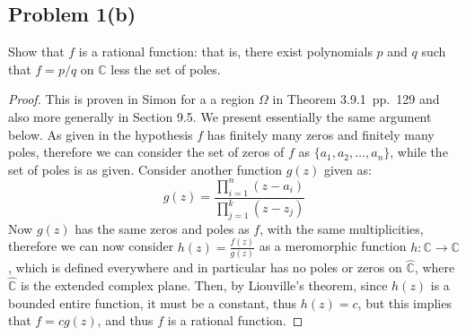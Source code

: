 \documentclass{article}[12pt]
\def\CC{{\mathbb C}}
\begin{document}
\subsection*{Problem 1(b)}Show that $f$ is a rational function: that is,
there exist polynomials $p$ and $q$ such that $f=p/q$ on $\CC$ less
the set of poles.
\begin{proof}
This is proven in Simon for a a region $\Omega$ in Theorem 3.9.1~pp.~129
and also more generally in Section 9.5. We present essentially the
same argument below.
As given in the hypothesis $f$ has finitely many zeros and finitely many
poles, therefore we can consider the set of zeros of $f$ as
$\{a_1,a_2,\ldots,a_n\}$, while the set of poles is as given.
Consider another function $g(z)$ given as:
\[
g(z)= \frac{\prod_{i=1}^n (z-a_i)}{\prod_{j=1}^k (z-z_j)}
\]
Now $g(z)$ has the same zeros and poles as $f$, with the same 
multiplicities, therefore we can now consider $h(z)=\frac{f(z)}{g(z)}$
as a meromorphic function $h:\CC\to\CC$, which is defined
everywhere and in particular has no poles or zeros on $\hat{\CC}$, where
$\hat{\CC}$ is the extended complex plane. 
Then, by Liouville's theorem,
since $h(z)$ is a bounded entire function, it must be a constant,
thus $h(z)=c$, but this implies that $f=cg(z)$, and thus $f$ is
a rational function.
\end{proof}
\end{document}

